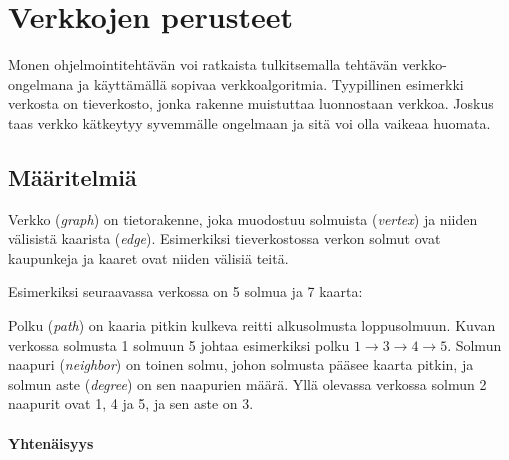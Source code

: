 \chapter{Verkkojen perusteet}
Monen ohjelmointitehtävän voi ratkaista tulkitsemalla
tehtävän verkko-on\-gel\-ma\-na ja käyttämällä
sopivaa verkkoalgoritmia.
Tyypillinen esimerkki verkosta on tieverkosto,
jonka rakenne muistuttaa luonnostaan verkkoa.
Joskus taas verkko kätkeytyy syvemmälle ongelmaan
ja sitä voi olla vaikeaa huomata.

\section{Määritelmiä}

Verkko (\textit{graph}) on tietorakenne,
joka muodostuu solmuista (\textit{vertex})
ja niiden välisistä kaarista (\textit{edge}).
Esimerkiksi tieverkostossa
verkon solmut ovat kaupunkeja ja kaaret ovat 
niiden välisiä teitä.

Esimerkiksi seuraavassa verkossa on 5 solmua ja 7 kaarta:

\begin{center}
\end{center}
                      
Polku (\textit{path}) on kaaria pitkin kulkeva reitti alkusolmusta
loppusolmuun.
Kuvan verkossa solmusta 1 solmuun 5
johtaa esimerkiksi polku $1 \rightarrow 3 \rightarrow 4 \rightarrow 5$.
Solmun naapuri (\textit{neighbor}) on toinen solmu,
johon solmusta pääsee kaarta pitkin,
ja solmun aste (\textit{degree}) on sen naapurien määrä.
Yllä olevassa verkossa solmun 2
naapurit ovat 1, 4 ja 5,
ja sen aste on 3.

\subsubsection*{Yhtenäisyys}

